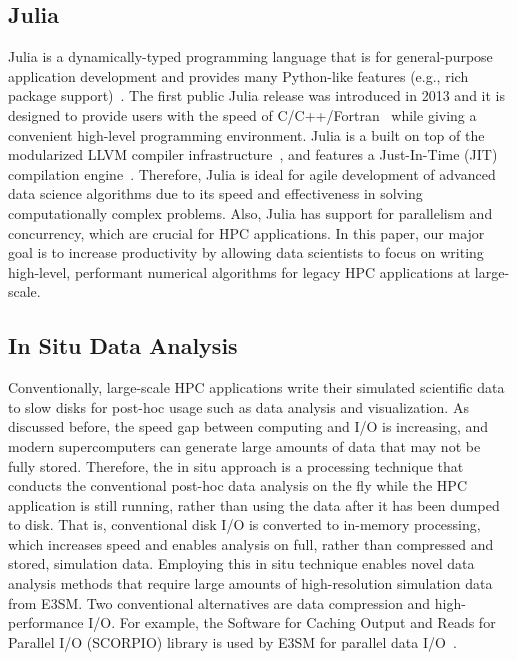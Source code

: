 \documentclass{juliacon}
\begin{document}
\subsection{Julia}

Julia is a dynamically-typed programming language that is for general-purpose application development and provides many Python-like features (e.g., rich package support)~\cite{bezanson2012julia}. The first public Julia release was introduced in 2013 and it is designed to provide users with the speed of C/C++/Fortran~\cite{bezanson2017julia} while giving a convenient high-level programming environment. Julia is a built on top of the modularized LLVM compiler infrastructure~\cite{lattner2004llvm}, and features a Just-In-Time (JIT) compilation engine~\cite{aycock2003brief}. Therefore, Julia is ideal for agile development of advanced data science algorithms due to its speed and effectiveness in solving computationally complex problems. Also, Julia has support for parallelism and concurrency, which are crucial for HPC applications. In this paper, our major goal is to increase productivity by allowing data scientists to focus on writing high-level, performant numerical algorithms for legacy HPC applications at large-scale.






\subsection{In Situ Data Analysis} 


Conventionally, large-scale HPC applications write their simulated scientific data to slow disks for post-hoc usage such as data analysis and visualization. As discussed before, the speed gap between computing and I/O is increasing, and modern supercomputers can generate large amounts of data that may not be fully stored. Therefore, the in situ approach is a processing technique that conducts the conventional post-hoc data analysis on the fly while the HPC application is still running, rather than using the data after it has been dumped to disk. That is, conventional disk I/O is converted to in-memory processing, which increases speed and enables analysis on full, rather than compressed and stored, simulation data. Employing this in situ technique enables novel data analysis methods that require large amounts of high-resolution simulation data from E3SM. Two conventional alternatives are data compression and high-performance I/O. For example, the Software for Caching Output and Reads for Parallel I/O (SCORPIO) library is used by E3SM for parallel data I/O~\cite{scorpio}.
\end{document}
